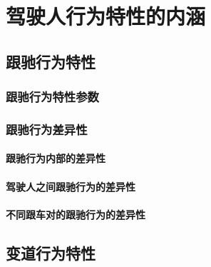 \chapter{驾驶人行为特性的内涵}




\section{跟驰行为特性}
\subsection{跟驰行为特性参数}
\subsection{跟驰行为差异性}
\subsubsection{跟驰行为内部的差异性}
\subsubsection{驾驶人之间跟驰行为的差异性}
\subsubsection{不同跟车对的跟驰行为的差异性}

\section{变道行为特性}

